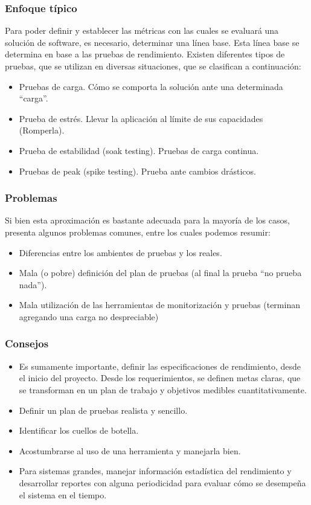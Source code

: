 \documentclass[12pt]{beamer}
\begin{document}
\begin{frame}
 \frametitle{Enfoque típico}
 Para poder definir y establecer las métricas con las cuales se evaluará una solución de software, es necesario, determinar una línea base. Esta línea base se determina en base a las pruebas de rendimiento. Existen diferentes tipos de pruebas, que se utilizan en diversas situaciones, que se clasifican a continuación:
 \begin{itemize}
  \item<2-> Pruebas de carga. Cómo se comporta la solución ante una determinada ``carga''.
  \item<3-> Prueba de estrés. Llevar la aplicación al límite de sus capacidades (Romperla).
  \item<4-> Prueba de estabilidad (soak testing). Pruebas de carga continua.
  \item<5-> Pruebas de peak (spike testing). Prueba ante cambios drásticos.
 \end{itemize}
\end{frame}


\begin{frame}
 \frametitle{Problemas}
 Si bien esta aproximación es bastante adecuada para la mayoría de los casos, presenta algunos problemas comunes, entre los cuales podemos resumir:
 \begin{itemize}
  \item<2-> Diferencias entre los ambientes de pruebas y los reales.
  \item<3-> Mala (o pobre) definición del plan de pruebas (al final la prueba ``no prueba nada'').
  \item<4-> Mala utilización de las herramientas de monitorización y pruebas (terminan agregando una carga no despreciable)
 \end{itemize}
\end{frame}


\begin{frame}
 \frametitle{Consejos}
 \begin{itemize}
  \item<1-> Es sumamente importante, definir las especificaciones de rendimiento, desde el inicio del proyecto. Desde los requerimientos, se definen metas claras, que se transforman en un plan de trabajo y objetivos medibles cuantitativamente.
  \item<2-> Definir un plan de pruebas realista y sencillo.
  \item<3-> Identificar los cuellos de botella.
  \item<4-> Acostumbrarse al uso de una herramienta y manejarla bien.
  \item<5-> Para sistemas grandes, manejar información estadística del rendimiento y desarrollar reportes con alguna periodicidad para evaluar cómo se desempeña el sistema en el tiempo.
 \end{itemize}
\end{frame}
\end{document}
